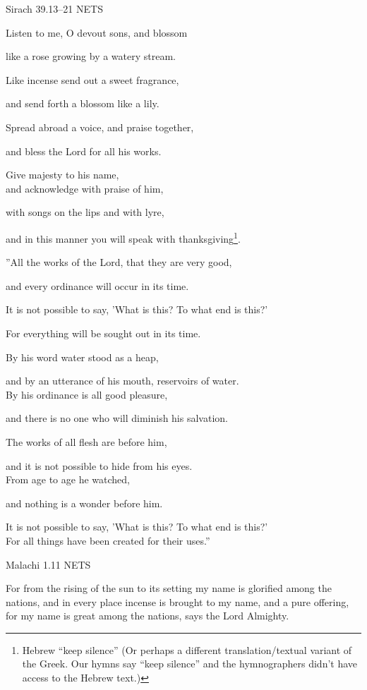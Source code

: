 \documentclass[
]{article}
\newcommand{\RL}[1]{\beginR #1\endR}
\begin{document}
Sirach 39.13--21 NETS

Listen to me, O devout sons, and blossom

like a rose growing by a watery stream.

Like incense send out a sweet fragrance,

and send forth a blossom like a lily.

Spread abroad a voice, and praise together,

and bless the Lord for all his works.

Give majesty to his name,\\
and acknowledge with praise of him,

with songs on the lips and with lyre,

and in this manner you will speak with thanksgiving\footnote{Hebrew
  ``keep silence'' (Or perhaps a different translation/textual variant
  of the Greek. Our hymns say ``keep silence'' and the hymnographers
  didn't have access to the Hebrew text.)}.

\RL{''}All the works of the Lord, that they are very good,

and every ordinance will occur in its time.

It is not possible to say, \RL{'}What is this? To what end is
this?\RL{'}

For everything will be sought out in its time.

By his word water stood as a heap,

and by an utterance of his mouth, reservoirs of water.\\
By his ordinance is all good pleasure,

and there is no one who will diminish his salvation.

The works of all flesh are before him,

and it is not possible to hide from his eyes.\\
From age to age he watched,

and nothing is a wonder before him.

It is not possible to say, \RL{'}What is this? To what end is
this?\RL{'\\
} For all things have been created for their uses.''

Malachi 1.11 NETS

For from the rising of the sun to its setting my name is glorified among
the nations, and in every place incense is brought to my name, and a
pure offering, for my name is great among the nations, says the Lord
Almighty.
\end{document}
